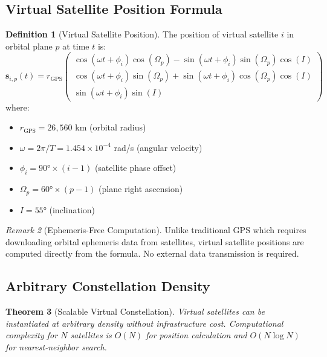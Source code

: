 \documentclass[twocolumn,10pt,a4paper]{article}
\newtheorem{theorem}{Theorem}[section]
\theoremstyle{definition}
\newtheorem{definition}[theorem]{Definition}
\theoremstyle{remark}
\newtheorem{remark}[theorem]{Remark}
\begin{document}
\subsection{Virtual Satellite Position Formula}

\begin{definition}[Virtual Satellite Position]
\label{def:virtual_sat}
The position of virtual satellite $i$ in orbital plane $p$ at time $t$ is:
\begin{equation}
    \mathbf{s}_{i,p}(t) = r_{\text{GPS}} \begin{pmatrix}
        \cos(\omega t + \phi_i) \cos(\Omega_p) - \sin(\omega t + \phi_i) \sin(\Omega_p) \cos(I) \\
        \cos(\omega t + \phi_i) \sin(\Omega_p) + \sin(\omega t + \phi_i) \cos(\Omega_p) \cos(I) \\
        \sin(\omega t + \phi_i) \sin(I)
    \end{pmatrix}
\end{equation}
where:
\begin{itemize}
    \item $r_{\text{GPS}} = 26,560$ km (orbital radius)
    \item $\omega = 2\pi/T = 1.454 \times 10^{-4}$ rad/s (angular velocity)
    \item $\phi_i = 90° \times (i-1)$ (satellite phase offset)
    \item $\Omega_p = 60° \times (p-1)$ (plane right ascension)
    \item $I = 55°$ (inclination)
\end{itemize}
\end{definition}

\begin{remark}[Ephemeris-Free Computation]
Unlike traditional GPS which requires downloading orbital ephemeris data from satellites, virtual satellite positions are computed directly from the formula. No external data transmission is required.
\end{remark}

\subsection{Arbitrary Constellation Density}

\begin{theorem}[Scalable Virtual Constellation]
\label{thm:scalable}
Virtual satellites can be instantiated at arbitrary density without infrastructure cost. Computational complexity for $N$ satellites is $O(N)$ for position calculation and $O(N \log N)$ for nearest-neighbor search.
\end{theorem}
\end{document}
